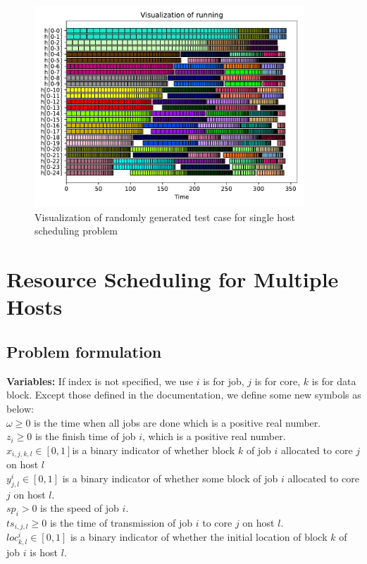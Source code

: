 \documentclass{llncs}
\begin{document}
\begin{figure}[htpb]
    \centering
    \includegraphics[width=0.9\textwidth]{task1_random_generate.pdf}
    \caption{Visualization of randomly generated test case for single host scheduling problem}
    \label{fig:task1_random}
\end{figure}

\newpage
\section*{Resource Scheduling for Multiple Hosts}
\subsection*{Problem formulation}
\textbf{Variables:} If index is not specified, we use $i$ is for job, $j$ is for core, $k$ is for data block.
Except those defined in the documentation, we define some new symbols as below:\\
$\omega \ge 0$ is the time when all jobs are done which is a positive real number.\\
$z_i \ge 0$ is the finish time of job $i$, which is a positive real number.\\
$x_{i,j,k,l}\in[0,1]$is a binary indicator of whether block $k$ of job $i$ allocated to core $j$ on host $l$\\
$y^i_{j,l}\in[0,1]$ is a binary indicator of whether some block of job $i$ allocated to core $j$ on host $l$.\\
$sp_i > 0$ is the speed of job $i$.\\
$ts_{i,j,l}\ge 0$ is the time of transmission of job $i$ to core $j$ on host $l$.\\
$loc_{k,l}^i \in [0, 1]$ is a binary indicator of whether the initial location of block $k$ of job $i$ is host $l$.\\
\end{document}
